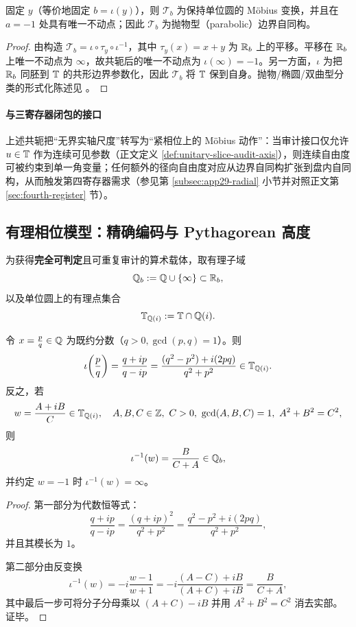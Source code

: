 \begin{corollary}[可见参数轴的内在化与抛物型分类]\label{cor:app29-visible-axis-parabolic}
固定 $y$（等价地固定 $b=\iota(y)$），则 $\mathcal{T}_b$ 为保持单位圆的 Möbius 变换，并且在 $a=-1$ 处具有唯一不动点；因此 $\mathcal{T}_b$ 为抛物型（parabolic）边界自同构。
\end{corollary}

\begin{proof}
由构造 $\mathcal{T}_b=\iota\circ \tau_y\circ\iota^{-1}$，其中 $\tau_y(x)=x+y$ 为 $\mathbb{R}_b$ 上的平移。平移在 $\mathbb{R}_b$ 上唯一不动点为 $\infty$，故共轭后的唯一不动点为 $\iota(\infty)=-1$。另一方面，$\iota$ 为把 $\mathbb{R}_b$ 同胚到 $\mathbb{T}$ 的共形边界参数化，因此 $\mathcal{T}_b$ 将 $\mathbb{T}$ 保到自身。抛物/椭圆/双曲型分类的形式化陈述见 \cite{SeriesHyperbolicNotes}。
\end{proof}

\paragraph{与三寄存器闭包的接口}
上述共轭把“无界实轴尺度”转写为“紧相位上的 Möbius 动作”：当审计接口仅允许 $u\in\mathbb{T}$ 作为连续可见参数（正文定义 \ref{def:unitary-slice-audit-axis}），则连续自由度可被约束到单一角变量；任何额外的径向自由度对应从边界自同构扩张到盘内自同构，从而触发第四寄存器需求（参见第 \ref{subsec:app29-radial} 小节并对照正文第 \ref{sec:fourth-register} 节）。

\subsection{有理相位模型：精确编码与 Pythagorean 高度}\label{subsec:app29-rational-phase-height}

为获得\textbf{完全可判定}且可重复审计的算术载体，取有理子域
$$
\mathbb{Q}_b:=\mathbb{Q}\cup\{\infty\}\subset\mathbb{R}_b,
$$
以及单位圆上的有理点集合
$$
\mathbb{T}_{\mathbb{Q}(i)}:=\mathbb{T}\cap\mathbb{Q}(i).
$$

\begin{theorem}[有理点的精确相位编码与反编码]\label{thm:app29-rational-encoding}
令 $x=\frac{p}{q}\in\mathbb{Q}$ 为既约分数（$q>0,\gcd(p,q)=1$）。则
$$
\iota\!\left(\frac{p}{q}\right)=\frac{q+ip}{q-ip}
=\frac{(q^2-p^2)+i(2pq)}{q^2+p^2}\in \mathbb{T}_{\mathbb{Q}(i)}.
$$
反之，若
$$
w=\frac{A+iB}{C}\in \mathbb{T}_{\mathbb{Q}(i)},\quad
A,B,C\in\mathbb{Z},\ C>0,\ \gcd(A,B,C)=1,\ A^2+B^2=C^2,
$$
则
$$
\iota^{-1}(w)=\frac{B}{C+A}\in\mathbb{Q}_b,
$$
并约定 $w=-1$ 时 $\iota^{-1}(w)=\infty$。
\end{theorem}

\begin{proof}
第一部分为代数恒等式：
$$
\frac{q+ip}{q-ip}=\frac{(q+ip)^2}{q^2+p^2}
=\frac{q^2-p^2+i(2pq)}{q^2+p^2},
$$
并且其模长为 $1$。
\par
第二部分由反变换
$$
\iota^{-1}(w)=-i\frac{w-1}{w+1}
=-i\frac{(A-C)+iB}{(A+C)+iB}
=\frac{B}{C+A},
$$
其中最后一步可将分子分母乘以 $(A+C)-iB$ 并用 $A^2+B^2=C^2$ 消去实部。证毕。
\end{proof}

